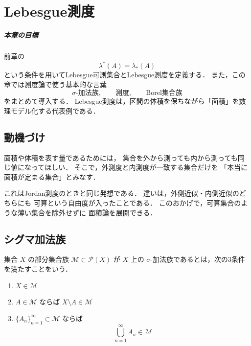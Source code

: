 \chapter{Lebesgue測度}

\paragraph{本章の目標}
前章の
\[
\lambda^*(A)=\lambda_*(A)
\]
という条件を用いてLebesgue可測集合とLebesgue測度を定義する．
また，この章では測度論で使う基本的な言葉
\[
\sigma\text{-加法族},\qquad \text{測度},\qquad \text{Borel集合族}
\]
をまとめて導入する．
Lebesgue測度は，区間の体積を保ちながら「面積」を数理モデル化する代表例である．

\section{動機づけ}

面積や体積を表す量であるためには，
集合を外から測っても内から測っても同じ値になってほしい．
そこで，外測度と内測度が一致する集合だけを
「本当に面積が定まる集合」とみなす．

これはJordan測度のときと同じ発想である．
違いは，外側近似・内側近似のどちらにも
可算という自由度が入ったことである．
このおかげで，可算集合のような薄い集合を除外せずに
面積論を展開できる．

\section{シグマ加法族}

\begin{definition}
集合 $X$ の部分集合族 $\mathcal M \subset \mathcal P(X)$ が
$X$ 上の $\sigma$-加法族であるとは，次の3条件を満たすことをいう．
\begin{enumerate}
    \item $X \in \mathcal M$
    \item $A \in \mathcal M$ ならば $X \setminus A \in \mathcal M$
    \item $\{A_n\}_{n=1}^{\infty} \subset \mathcal M$ ならば
    \[
    \bigcup_{n=1}^{\infty} A_n \in \mathcal M
    \]
\end{enumerate}
\end{definition}


